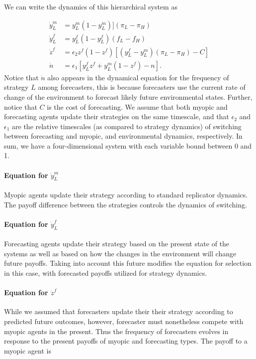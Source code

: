 \documentclass{article}
\begin{document}
We can write the dynamics of this hierarchical system as

\begin{align}
\dot{y}_L^m&=y_L^m(1-y_L^m)]\left(\pi_L-\pi_H\right)\\
\dot{y}_L^f&=y_L^f(1-y_L^f)\left(f_L-f_H\right)\\
\dot{z}^f&=\epsilon_2 z^f(1-z^f)\left[(y_L^f-y_L^m)\left(\pi_L-\pi_H\right)-C\right]\\
\dot{n}&=\epsilon_1\left[y_L^f z^f+y_L^m(1-z^f)-n\right].
\end{align}
Notice that $\dot{n}$ also appears in the dynamical equation for the frequency of strategy $L$ among forecasters, this is because forecasters use the current rate of change of the environment to forecast likely future environmental states. Further, notice that $C$ is the cost of forecasting. We assume that both myopic and forecasting agents update their strategies on the same timescale, and that $\epsilon_2$ and $\epsilon_1$ are the relative timescales (as compared to strategy dynamics) of switching between forecasting and myopic, and environmental dynamics, respectively. In sum, we have a four-dimensional system with each variable bound between 0 and 1.
\paragraph{Equation for $\dot{y}^m_L$ }
Myopic agents update their strategy according to standard replicator dynamics. The payoff difference between the strategies controls the dynamics of switching.

\paragraph{Equation for $\dot{y}^f_L$}
Forecasting agents update their strategy based on the present state of the systems as well as based on how the changes in the environment will change future payoffs. Taking into account this future modifies the equation for selection in this case, with forecasted payoffs utilized for strategy dynamics.

\paragraph{Equation for $\dot{z}^f$} While we assumed that forecasters update their their strategy according to predicted future outcomes, however, forecaster must nonetheless compete with myopic agents in the present. Thus the frequency of forecasters evolves in response to the present payoffs of myopic and forecasting types. The payoff to a myopic agent is 
\end{document}
